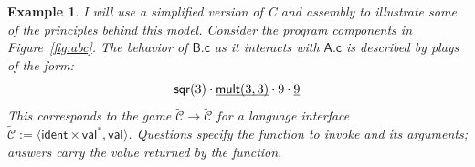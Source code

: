 \documentclass[11pt,oneside]{book}
\newtheorem{example}[theorem]{Example}
\theoremstyle{definition}
\newcommand{\kw}[1]{\ensuremath{ \mathsf{#1} }}
\newcommand{\ul}[1]{%
  \underline{\smash{#1}}
}
\begin{document}
\begin{example} \label{ex:abc} %
I will use a simplified version of C and assembly
to illustrate some of the principles behind this model.
Consider the program components in Figure~\ref{fig:abc}.
The behavior of $\textsf{B.c}$
as it interacts with $\textsf{A.c}$
is described by plays of the form:
\begin{equation} \label{eqn:cplay}
  \mathsf{sqr}(3) \cdot
    \ul{\mathsf{mult}(3,3)} \cdot 9 \cdot \ul{9}
\end{equation}
This corresponds to the game
$\tilde{\mathcal{C}} \rightarrow \tilde{\mathcal{C}}$
for a language interface
$\tilde{\mathcal{C}} :=
 \langle \kw{ident} \times \kw{val}^*, \kw{val} \rangle$.
Questions specify the function to invoke
and its arguments;
answers carry the value returned by the function.


\end{example}
\end{document}

